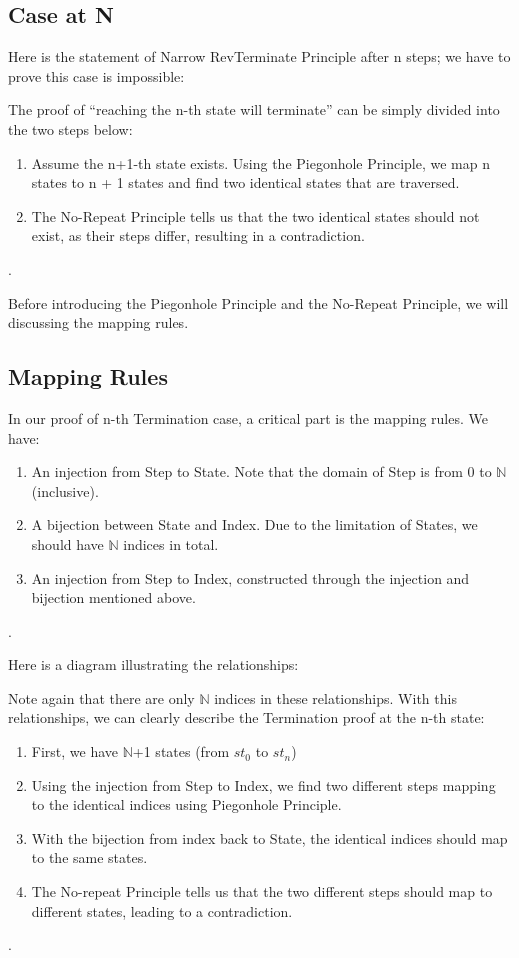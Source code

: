 

\subsection{ Case at N }
Here is the statement of Narrow RevTerminate Principle after n steps; we have to prove this case is impossible:



The proof of ``reaching the n-th state will terminate'' can be simply divided into the two steps below:
\begin{enumerate}[1.]
    \item Assume the n+1-th state exists. Using the Piegonhole Principle, we map n states to n + 1 states and find two identical states that are traversed.
    \item The No-Repeat Principle tells us that the two identical states should not exist, as their steps differ, resulting in a contradiction.
\end{enumerate}.

Before introducing the Piegonhole Principle and the No-Repeat Principle, we will discussing the mapping rules.

\subsection{ Mapping Rules }
In our proof of n-th Termination case, a critical part is the mapping rules.
We have:
\begin{enumerate}[1.]
    \item An injection from Step to State.  Note that the domain of Step is from 0 to $\mathbb{N}$ (inclusive).
    \item A bijection between State and Index. Due to the limitation of States, we should have $\mathbb{N}$ indices in total.
    \item An injection from Step to Index, constructed through the injection and bijection mentioned above.
\end{enumerate}.

Here is a diagram illustrating the relationships:



Note again that there are only $\mathbb{N}$ indices in these relationships.
With this relationships, we can clearly describe the Termination proof at the n-th state:
\begin{enumerate}[1.]
    \item First, we have $\mathbb{N}$+1 states (from $st_{0}$ to $st_{n}$)
    \item Using the injection from Step to Index, we find two different steps mapping to the identical indices using Piegonhole Principle.
    \item With the bijection from index back to State, the identical indices should map to the same states.
    \item The No-repeat Principle tells us that the two different steps should map to different states, leading to a contradiction.
\end{enumerate}.

